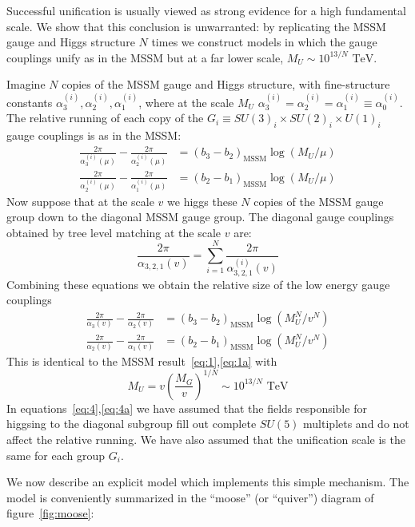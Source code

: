 \documentclass[a4paper,prl,twocolumn]{revtex4}
\newcommand{\TeV}{\text{ TeV}}
\begin{document}
Successful unification is usually viewed as strong evidence
for a high fundamental scale.
We show that this conclusion is unwarranted: by replicating the MSSM
gauge and Higgs structure $N$ times we construct models in which the
gauge couplings unify as in the MSSM but at a far lower scale,
$M_U\sim 10^{13/N} \TeV$.

Imagine $N$ copies of the MSSM gauge and Higgs structure, with
fine-structure constants $\alpha_3^{(i)}, \alpha_2^{(i)},
\alpha_1^{(i)}$, where at the scale $M_U$
$\alpha_3^{(i)}=\alpha_2^{(i)}=\alpha_1^{(i)}\equiv \alpha_0^{(i)}$.
The relative running of each copy of the $G_i\equiv SU(3)_i\times
SU(2)_i\times U(1)_i$ gauge couplings is as in the MSSM:
\begin{align}
  \label{eq:2}
  \frac{2\pi}{\alpha_3^{(i)}(\mu)}-\frac{2\pi}{\alpha_2^{(i)}(\mu)} &=
  (b_3-b_2)_{\text{MSSM}} \log(M_U/\mu) \\
  \frac{2\pi}{\alpha_2^{(i)}(\mu)}-\frac{2\pi}{\alpha_1^{(i)}(\mu)} &=
  (b_2-b_1)_{\text{MSSM}} \log(M_U/\mu) 
\end{align}
Now suppose that at the scale $v$ we higgs these $N$
copies of the MSSM gauge group down to the diagonal MSSM gauge group.
The diagonal gauge couplings obtained by tree level matching at the
scale $v$ are:
\begin{equation}
  \label{eq:3}
  \frac{2\pi}{\alpha_{3,2,1}(v)} = \sum_{i=1}^N
  \frac{2\pi}{\alpha_{3,2,1}^{(i)}(v)}
\end{equation}
Combining these equations we obtain the relative size of the low
energy gauge couplings
\begin{align}
  \label{eq:4}
  \frac{2\pi}{\alpha_3(v)}-\frac{2\pi}{\alpha_2(v)} &=
  (b_3-b_2)_{\text{MSSM}} \log \left(M_U^N/v^N\right) \\
  \label{eq:4a}
  \frac{2\pi}{\alpha_2(v)}-\frac{2\pi}{\alpha_1(v)} &=
  (b_2-b_1)_{\text{MSSM}} \log \left(M_U^N/v^N\right)
\end{align}
This  is identical to the MSSM result~\eqref{eq:1},\eqref{eq:1a}
with
\begin{equation}
  \label{eq:5}
  M_U =v  \left(\frac{M_G}{v}\right)^{1/N}\sim 10^{13/N} \TeV  
\end{equation}
In equations~\eqref{eq:4},\eqref{eq:4a} we have
assumed that the fields responsible for higgsing to the
diagonal subgroup fill out complete $SU(5)$ multiplets and do not
affect the relative running.  We have also assumed that the
unification scale is the same for each group $G_i$. 


We now describe an explicit model which implements this simple
mechanism.  The model is conveniently summarized in the ``moose'' (or
``quiver'') diagram of figure~\ref{fig:moose}:
\end{document}
